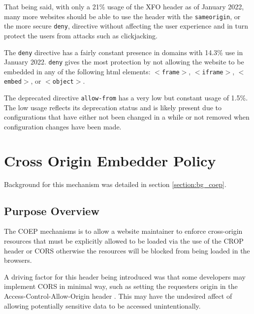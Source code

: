 \documentclass{mscreport}
\begin{document}
\vspace{0.3cm} \noindent
That being said, with only a 21\% usage of the XFO header as of January 2022, many more websites should be able to use the header with the \texttt{sameorigin}, or the more secure \texttt{deny}, directive without affecting the user experience and in turn protect the users from attacks such as clickjacking.

\vspace{0.3cm} \noindent
The \texttt{deny} directive has a fairly constant presence in domains with 14.3\% use in January 2022. \texttt{deny} gives the most protection by not allowing the website to be embedded in any of the following html elements: \texttt{$<$frame$>$}, \texttt{$<$iframe$>$}, \texttt{$<$embed$>$}, or \texttt{$<$object$>$}.

\vspace{0.3cm} \noindent
The deprecated directive \texttt{allow-from} has a very low but constant usage of 1.5\%. The low usage reflects its deprecation status and is likely present due to configurations that have either not been changed in a while or not removed when configuration changes have been made.

\clearpage
\newpage


\section{Cross Origin Embedder Policy}
\label{section:ana_coep}

Background for this mechanism was detailed in section \ref{section:bg_coep}.

\subsection{Purpose Overview}

\noindent
The COEP mechanisms is to allow a website maintainer to enforce cross-origin resources that must be explicitly allowed to be loaded via the use of the CROP header or CORS otherwise the resources will be blocked from being loaded in the browsers.

\vspace{0.3cm} \noindent
A driving factor for this header being introduced was that some developers may implement CORS in minimal way, such as setting the requesters origin in the Access-Control-Allow-Origin header \cite{noauthor_undated-cr}. This may have the undesired affect of allowing potentially sensitive data to be accessed unintentionally.
\end{document}
